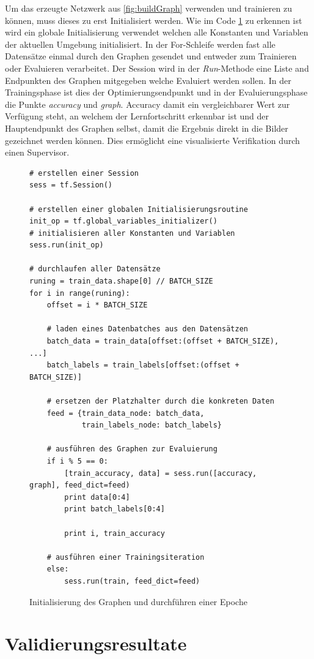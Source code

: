 Um das erzeugte Netzwerk aus \ref{fig:buildGraph} verwenden und trainieren zu können, muss dieses zu erst Initialisiert werden. 
Wie im Code \ref{fig:initRun} zu erkennen ist wird ein globale Initialisierung verwendet welchen alle Konstanten und Variablen der aktuellen Umgebung initialisiert. 
In der For-Schleife werden fast alle Datensätze einmal durch den Graphen gesendet und entweder zum Trainieren oder Evaluieren verarbeitet. 
Der Session wird in der \textit{Run}-Methode eine Liste and Endpunkten des Graphen mitgegeben welche Evaluiert werden sollen. 
In der Trainingsphase ist dies der Optimierungsendpunkt und in der Evaluierungsphase die Punkte \textit{accuracy} und \textit{graph}. 
Accuracy damit ein vergleichbarer Wert zur Verfügung steht, an welchem der Lernfortschritt erkennbar ist und der Hauptendpunkt des Graphen selbst, damit die Ergebnis direkt in die Bilder gezeichnet werden können. 
Dies ermöglicht eine visualisierte Verifikation durch einen Supervisor. 
\begin{figure}[ht!]
\lstset{language=Python}
\begin{lstlisting}
# erstellen einer Session
sess = tf.Session()

# erstellen einer globalen Initialisierungsroutine
init_op = tf.global_variables_initializer()
# initialisieren aller Konstanten und Variablen
sess.run(init_op)

# durchlaufen aller Datensätze
runing = train_data.shape[0] // BATCH_SIZE
for i in range(runing):
    offset = i * BATCH_SIZE
    
    # laden eines Datenbatches aus den Datensätzen
    batch_data = train_data[offset:(offset + BATCH_SIZE), ...]
    batch_labels = train_labels[offset:(offset + BATCH_SIZE)]
    
    # ersetzen der Platzhalter durch die konkreten Daten
    feed = {train_data_node: batch_data, 
            train_labels_node: batch_labels}
     
    # ausführen des Graphen zur Evaluierung
    if i % 5 == 0:
        [train_accuracy, data] = sess.run([accuracy, graph], feed_dict=feed)
        print data[0:4]
        print batch_labels[0:4]
        
        print i, train_accuracy
        
    # ausführen einer Trainingsiteration
    else:
        sess.run(train, feed_dict=feed)
\end{lstlisting}
	\caption{Initialisierung des Graphen und durchführen einer Epoche}
	\label{fig:initRun}
\end{figure}

\section{Validierungsresultate}






